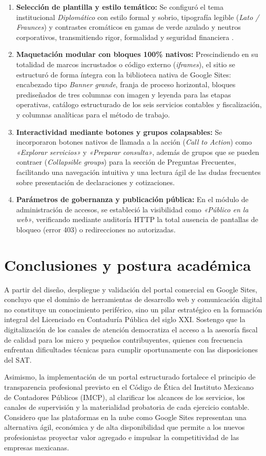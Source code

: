 {\begin{enumerate}
\item \textbf{Selección de plantilla y estilo temático:} Se configuró el tema institucional \textit{Diplomático} con estilo formal y sobrio, tipografía legible (\textit{Lato / Fraunces}) y contrastes cromáticos en gamas de verde azulado y neutros corporativos, transmitiendo rigor, formalidad y seguridad financiera \parencite{googleSitesAyuda}.
\item \textbf{Maquetación modular con bloques 100\% nativos:} Prescindiendo en su totalidad de marcos incrustados o código externo (\textit{iframes}), el sitio se estructuró de forma íntegra con la biblioteca nativa de Google Sites: encabezado tipo \textit{Banner grande}, franja de proceso horizontal, bloques prediseñados de tres columnas con imagen y leyenda para las etapas operativas, catálogo estructurado de los seis servicios contables y fiscalización, y columnas analíticas para el método de trabajo.
\item \textbf{Interactividad mediante botones y grupos colapsables:} Se incorporaron botones nativos de llamada a la acción (\textit{Call to Action}) como \textit{«Explorar servicios»} y \textit{«Preparar consulta»}, además de grupos que se pueden contraer (\textit{Collapsible groups}) para la sección de Preguntas Frecuentes, facilitando una navegación intuitiva y una lectura ágil de las dudas frecuentes sobre presentación de declaraciones y cotizaciones.
\item \textbf{Parámetros de gobernanza y publicación pública:} En el módulo de administración de accesos, se estableció la visibilidad como \textit{«Público en la web»}, verificando mediante auditoría HTTP la total ausencia de pantallas de bloqueo (error 403) o redirecciones no autorizadas.
\end{enumerate}

\section{Conclusiones y postura académica}
A partir del diseño, despliegue y validación del portal comercial en Google Sites, concluyo que el dominio de herramientas de desarrollo web y comunicación digital no constituye un conocimiento periférico, sino un pilar estratégico en la formación integral del Licenciado en Contaduría Pública del siglo XXI. Sostengo que la digitalización de los canales de atención democratiza el acceso a la asesoría fiscal de calidad para los micro y pequeños contribuyentes, quienes con frecuencia enfrentan dificultades técnicas para cumplir oportunamente con las disposiciones del SAT.

Asimismo, la implementación de un portal estructurado fortalece el principio de transparencia profesional previsto en el Código de Ética del Instituto Mexicano de Contadores Públicos (IMCP), al clarificar los alcances de los servicios, los canales de supervisión y la materialidad probatoria de cada ejercicio contable. Considero que las plataformas en la nube como Google Sites representan una alternativa ágil, económica y de alta disponibilidad que permite a los nuevos profesionistas proyectar valor agregado e impulsar la competitividad de las empresas mexicanas.
}


